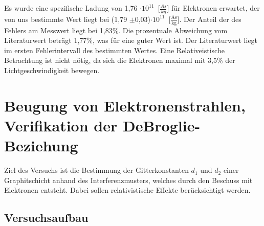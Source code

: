 \documentclass[12pt,a4paper]{article}
\begin{document}
Es wurde eine spezifische Ladung von \unit{1,76 $\cdot 10^{11}$}[$\frac{As}{kg}$] für Elektronen erwartet, der von uns bestimmte Wert liegt bei \unit{(1,79 $\pm$0,03)$\cdot 10^{11}$}[$\frac{\text{As}}{\text{kg}}$]. Der Anteil der des Fehlers am Messwert liegt bei 1,83\%. Die prozentuale Abweichung vom Literaturwert beträgt 1,77\%, was für eine guter Wert ist. Der Literaturwert liegt im ersten Fehlerintervall des bestimmten Wertes. Eine Relativeistische Betrachtung ist nicht nötig, da sich die Elektronen maximal mit 3,5\% der Lichtgeschwindigkeit bewegen.

\section{Beugung von Elektronenstrahlen, Verifikation der DeBroglie-Beziehung}
Ziel des Versuchs ist die Bestimmung der Gitterkonstanten $d_1$ und $d_2$ einer Graphitschicht anhand des Interferenzmusters, welches durch den Beschuss mit Elektronen entsteht. Dabei sollen relativistische Effekte berücksichtigt werden.
\subsection{Versuchsaufbau}
\end{document}
